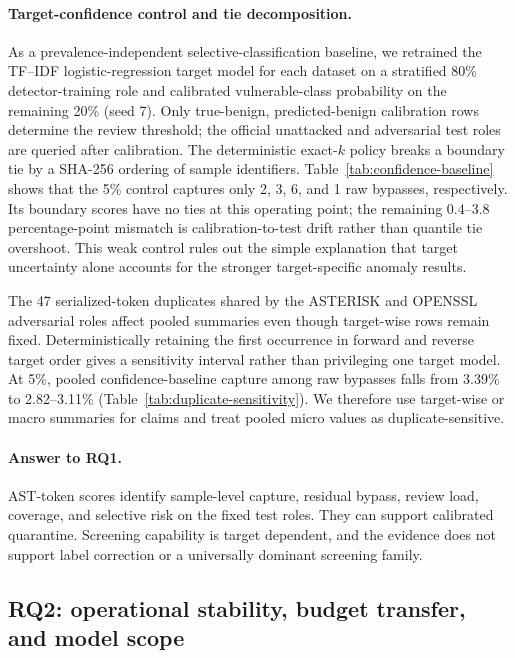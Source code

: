 \documentclass[a4paper,fleqn]{cas-dc}
\newcommand{\dataset}[1]{\textsc{#1}}
\begin{document}
\paragraph{Target-confidence control and tie decomposition.}
As a prevalence-independent selective-classification baseline, we retrained the TF--IDF logistic-regression target model for each dataset on a stratified 80\% detector-training role and calibrated vulnerable-class probability on the remaining 20\% (seed 7). Only true-benign, predicted-benign calibration rows determine the review threshold; the official unattacked and adversarial test roles are queried after calibration. The deterministic exact-$k$ policy breaks a boundary tie by a SHA-256 ordering of sample identifiers. Table~\ref{tab:confidence-baseline} shows that the 5\% control captures only 2, 3, 6, and 1 raw bypasses, respectively. Its boundary scores have no ties at this operating point; the remaining 0.4--3.8 percentage-point mismatch is calibration-to-test drift rather than quantile tie overshoot. This weak control rules out the simple explanation that target uncertainty alone accounts for the stronger target-specific anomaly results.



The 47 serialized-token duplicates shared by the \dataset{ASTERISK} and \dataset{OPENSSL} adversarial roles affect pooled summaries even though target-wise rows remain fixed. Deterministically retaining the first occurrence in forward and reverse target order gives a sensitivity interval rather than privileging one target model. At 5\%, pooled confidence-baseline capture among raw bypasses falls from 3.39\% to 2.82--3.11\% (Table~\ref{tab:duplicate-sensitivity}). We therefore use target-wise or macro summaries for claims and treat pooled micro values as duplicate-sensitive.



\paragraph{Answer to RQ1.} AST-token scores identify sample-level capture, residual bypass, review load, coverage, and selective risk on the fixed test roles. They can support calibrated quarantine. Screening capability is target dependent, and the evidence does not support label correction or a universally dominant screening family.

\subsection{RQ2: operational stability, budget transfer, and model scope}
\end{document}
